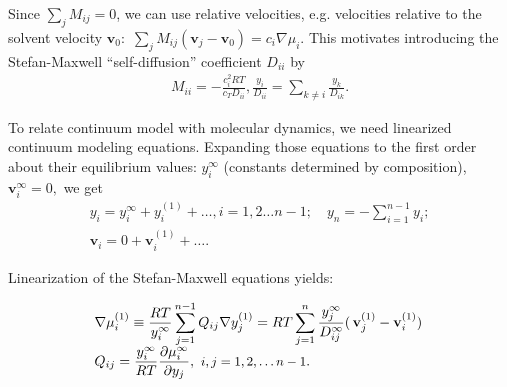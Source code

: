 \documentclass[../main.tex]{subfiles}
\begin{document}
Since $\sum_{j } M_{ij} = 0$, we can use relative velocities, e.g. velocities relative to the solvent velocity  $\mathbf{v}_0 :$
$
 \sum_{j }  M_{ij} \left(  \mathbf{v}_j - \mathbf{v}_0 \right) = c_i \nabla \mu_i.
     \label{StM:MM}
$
This motivates introducing the Stefan-Maxwell ``self-diffusion'' coefficient $D_{ii}$ by
\begin{equation} \begin{array}{l}
   M_{ii} = -\frac{c_i^2 R  T }{c_T D_{ii}}, \frac{y_i }{ D_{ii}} = \sum_{k\neq i} \frac{y_k }{ D_{ik}}.
\end{array} \end{equation}


To relate continuum model with molecular dynamics, we need linearized continuum modeling equations. %
Expanding those equations to the first order about their equilibrium values:
$y_i^\infty$ (constants determined by composition), $\mathbf{v}_i^{\infty} = 0,$ we get
\begin{equation} \begin{array}{l}
    y_i = y_i^\infty + y_i^{(1)}+ \ldots, i=1,2\ldots n-1; \quad y_n = - \displaystyle\sum_{i=1}^{n-1} y_i;
    \\
    \mathbf{v}_i = 0 + \mathbf{v}_i^{(1)} + \ldots .
\end{array} \end{equation}

\noindent Linearization of the Stefan-Maxwell equations yields:

\begin{equation} \begin{array}{l}
    \nabla \mu_i^{(1)} \equiv \displaystyle   \frac{RT}{y_i^{\infty}}
    \sum_{j=1}^{n-1} Q_{ij} \nabla  y_j^{(1)}
     = RT \displaystyle \sum_{j=1}^{n}\frac{y_j^{\infty}}{D_{ij}^{\infty}} ( \, \mathbf{v}_j^{(1)} - \mathbf{v}_i^{(1)}) \,
    \\
    Q_{ij} = \displaystyle \frac{ y_i^{\infty} }{RT} \frac{\partial \mu_i^{\infty} }{\partial  y_j}, \ \mbox{\small $i,j  =1,2,\ldots n-1$}.
    \label{linStefMax}
\end{array} \end{equation}
\end{document}
